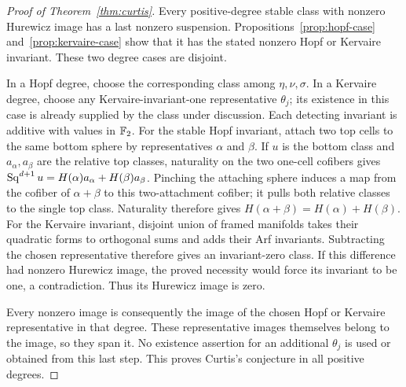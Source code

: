 \begin{proof}[Proof of Theorem~\ref{thm:curtis}]
Every positive-degree stable class with nonzero Hurewicz image has a
last nonzero suspension. Propositions~\ref{prop:hopf-case}
and~\ref{prop:kervaire-case} show that it has the stated nonzero
Hopf or Kervaire invariant. These two degree cases are disjoint.

In a Hopf degree, choose the corresponding class among
\(\eta,\nu,\sigma\). In a Kervaire degree, choose any
Kervaire-invariant-one representative \(\theta_j\); its existence
in this case is already supplied by the class under discussion. Each
detecting invariant is additive with values in \(\mathbb F_2\).
For the stable Hopf invariant, attach two top cells to the same bottom
sphere by representatives \(\alpha\) and \(\beta\). If \(u\)
is the bottom class and \(a_\alpha,a_\beta\) are the relative top
classes, naturality on the two one-cell cofibers gives
\(\operatorname{Sq}^{d+1}u=H(\alpha)a_\alpha+H(\beta)a_\beta\).
Pinching the attaching sphere induces a map from the cofiber of
\(\alpha+\beta\) to this two-attachment cofiber; it pulls both
relative classes to the single top class. Naturality therefore gives
\(H(\alpha+\beta)=H(\alpha)+H(\beta)\).
For the Kervaire invariant, disjoint union of framed manifolds takes
their quadratic forms to orthogonal sums and adds their Arf
invariants. Subtracting
the chosen representative therefore gives an invariant-zero class.
If this difference had nonzero Hurewicz image, the proved necessity
would force its invariant to be one, a contradiction. Thus its
Hurewicz image is zero.

Every nonzero image is consequently the image of the chosen Hopf or
Kervaire representative in that degree. These representative images
themselves belong to the image, so they span it. No existence assertion
for an additional \(\theta_j\) is used or obtained from this last
step. This proves Curtis's conjecture in all positive degrees.
\end{proof}
